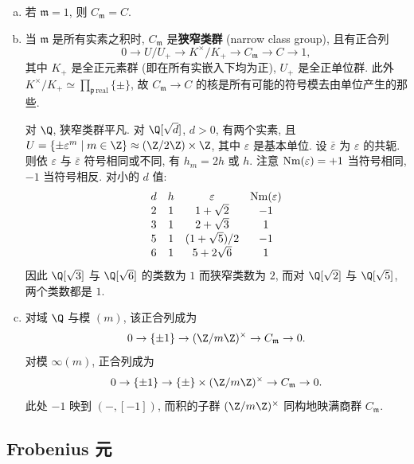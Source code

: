 \begin{example}\label{ex:v.1.8}
\begin{enumerate}[(a)]
\item 若 $\mathfrak{m}=1$, 则 $C_{\mathfrak{m}}=C$.
\item 当 $\mathfrak{m}$ 是所有实素之积时, $C_{\mathfrak{m}}$ 是\textbf{狭窄类群} (narrow class group), 且有正合列
\[
0\to U/U_+\to K^{\times}/K_+\to C_{\mathfrak{m}}\to C\to1,
\]
其中 $K_+$ 是全正元素群 (即在所有实嵌入下均为正), $U_+$ 是全正单位群. 此外 $K^{\times}/K_+\simeq\prod_{\mathfrak{p}\,\mathrm{real}}\{\pm\}$, 故 $C_{\mathfrak{m}}\to C$ 的核是所有可能的符号模去由单位产生的那些.

对 $\Q$, 狭窄类群平凡. 对 $\Q[\sqrt{d}]$, $d>0$, 有两个实素, 且 $U=\{\pm\varepsilon^m\mid m\in\Z\}\approx(\Z/2\Z)\times\Z$, 其中 $\varepsilon$ 是基本单位. 设 $\bar{\varepsilon}$ 为 $\varepsilon$ 的共轭. 则依 $\varepsilon$ 与 $\bar{\varepsilon}$ 符号相同或不同, 有 $h_m=2h$ 或 $h$. 注意 $\operatorname{Nm}(\varepsilon)=+1$ 当符号相同, $-1$ 当符号相反. 对小的 $d$ 值:
\[
\begin{array}{cccc}
d & h & \varepsilon & \operatorname{Nm}(\varepsilon)\\
2 & 1 & 1+\sqrt{2} & -1\\
3 & 1 & 2+\sqrt{3} & 1\\
5 & 1 & (1+\sqrt{5})/2 & -1\\
6 & 1 & 5+2\sqrt{6} & 1
\end{array}
\]
因此 $\Q[\sqrt{3}]$ 与 $\Q[\sqrt{6}]$ 的类数为 $1$ 而狭窄类数为 $2$, 而对 $\Q[\sqrt{2}]$ 与 $\Q[\sqrt{5}]$, 两个类数都是 $1$.
\item 对域 $\Q$ 与模 $(m)$, 该正合列成为
\[
0\to\{\pm1\}\to(\Z/m\Z)^{\times}\to C_{\mathfrak{m}}\to 0.
\]
对模 $\infty(m)$, 正合列成为
\[
0\to\{\pm1\}\to\{\pm\}\times(\Z/m\Z)^{\times}\to C_{\mathfrak{m}}\to 0.
\]
此处 $-1$ 映到 $(-,[-1])$, 而积的子群 $(\Z/m\Z)^{\times}$ 同构地映满商群 $C_{\mathfrak{m}}$.
\end{enumerate}
\end{example}

\subsection*{Frobenius 元}

